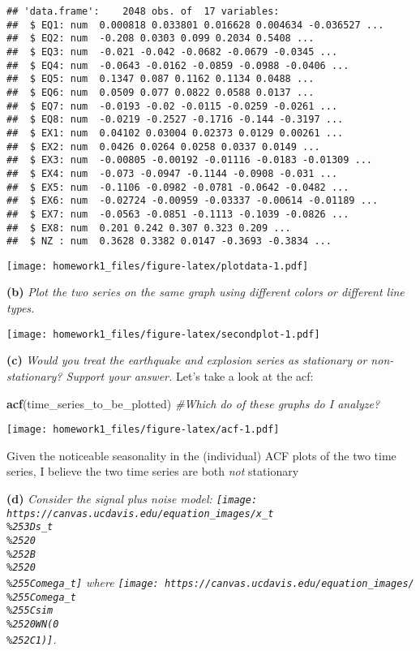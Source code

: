 \documentclass[]{article}
\newenvironment{Shaded}{\begin{snugshade}}{\end{snugshade}}
\newcommand{\CommentTok}[1]{\textcolor[rgb]{0.56,0.35,0.01}{\textit{#1}}}
\newcommand{\KeywordTok}[1]{\textcolor[rgb]{0.13,0.29,0.53}{\textbf{#1}}}
\newcommand{\NormalTok}[1]{#1}
\begin{document}
\begin{verbatim}
## 'data.frame':    2048 obs. of  17 variables:
##  $ EQ1: num  0.000818 0.033801 0.016628 0.004634 -0.036527 ...
##  $ EQ2: num  -0.208 0.0303 0.099 0.2034 0.5408 ...
##  $ EQ3: num  -0.021 -0.042 -0.0682 -0.0679 -0.0345 ...
##  $ EQ4: num  -0.0643 -0.0162 -0.0859 -0.0988 -0.0406 ...
##  $ EQ5: num  0.1347 0.087 0.1162 0.1134 0.0488 ...
##  $ EQ6: num  0.0509 0.077 0.0822 0.0588 0.0137 ...
##  $ EQ7: num  -0.0193 -0.02 -0.0115 -0.0259 -0.0261 ...
##  $ EQ8: num  -0.0219 -0.2527 -0.1716 -0.144 -0.3197 ...
##  $ EX1: num  0.04102 0.03004 0.02373 0.0129 0.00261 ...
##  $ EX2: num  0.0426 0.0264 0.0258 0.0337 0.0149 ...
##  $ EX3: num  -0.00805 -0.00192 -0.01116 -0.0183 -0.01309 ...
##  $ EX4: num  -0.073 -0.0947 -0.1144 -0.0908 -0.031 ...
##  $ EX5: num  -0.1106 -0.0982 -0.0781 -0.0642 -0.0482 ...
##  $ EX6: num  -0.02724 -0.00959 -0.03337 -0.00614 -0.01189 ...
##  $ EX7: num  -0.0563 -0.0851 -0.1113 -0.1039 -0.0826 ...
##  $ EX8: num  0.201 0.242 0.307 0.323 0.209 ...
##  $ NZ : num  0.3628 0.3382 0.0147 -0.3693 -0.3834 ...
\end{verbatim}

\texttt{[image: homework1\_files/figure-latex/plotdata-1.pdf]}

\textbf{(b)} \emph{Plot the two series on the same graph using different
colors or different line types.}

\texttt{[image: homework1\_files/figure-latex/secondplot-1.pdf]}

\textbf{(c)} \emph{Would you treat the earthquake and explosion series
as stationary or non-stationary? Support your answer.} Let's take a look
at the acf:

\begin{Shaded}
\begin{Highlighting}[]
\KeywordTok{acf}\NormalTok{(time_series_to_be_plotted) }\CommentTok{#Which do of these graphs do I analyze?}
\end{Highlighting}
\end{Shaded}

\texttt{[image: homework1\_files/figure-latex/acf-1.pdf]}

Given the noticeable seasonality in the (individual) ACF plots of the
two time series, I believe the two time series are both \emph{not}
stationary

\textbf{(d)} \emph{Consider the signal plus noise model:
\texttt{[image: https://canvas.ucdavis.edu/equation\_images/x\_t\\\%253Ds\_t\\\%2520\\\%252B\\\%2520\\\%255Comega\_t]}
where
\texttt{[image: https://canvas.ucdavis.edu/equation\_images/\\\%255Comega\_t\\\%255Csim\\\%2520WN(0\\\%252C1)]}.}
\end{document}
